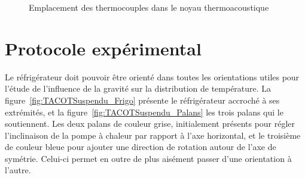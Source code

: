 \begin{figure}[!ht]
    \centering
    
    \caption{Emplacement des thermocouples dans le noyau thermoacoustique}
    \label{fig:TCdansNoyau}
\end{figure}

%
%    

\section{Protocole expérimental}\label{chap:ProtocolExpe}
Le réfrigérateur doit pouvoir être orienté dans toutes les orientations utiles pour l'étude de l'influence de la gravité sur la distribution de température. La figure~\ref{fig:TACOTSuspendu_Frigo} présente le réfrigérateur accroché à ses extrémités, et la figure~\ref{fig:TACOTSuspendu_Palans} les trois palans qui le soutiennent. Les deux palans de couleur grise, initialement présents pour régler l'inclinaison de la pompe à chaleur par rapport à l'axe horizontal, et le troisième de couleur bleue pour ajouter une direction de rotation autour de l'axe de symétrie. Celui-ci permet en outre de plus aisément passer d'une orientation à l'autre. 

